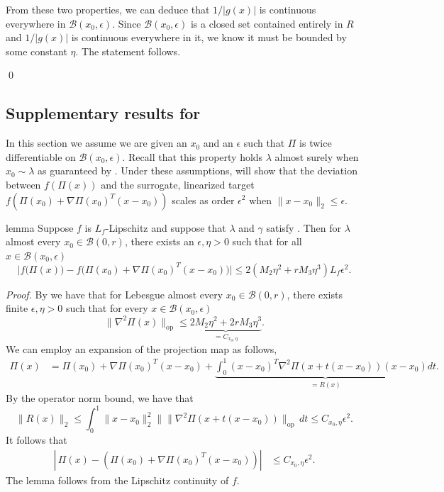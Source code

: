 \documentclass[11pt]{article}
\begin{document}
From these two properties, we can deduce that $1/|g(x)|$ is continuous everywhere in $\mathcal{B}(x_0,\epsilon)$. Since $\mathcal{B}(x_0,\epsilon)$ is a closed set contained entirely in $R$ and $1/|g(x)|$ is continuous everywhere in it, we know it must be bounded by some constant $\eta$. The statement follows.

\qed{}


\subsection{Supplementary results for }

In this section we assume we are given an $x_0$ and an $\epsilon$ such that $\Pi$ is twice differentiable on $\mathcal{B}(x_0, \epsilon)$. Recall that this property holds $\lambda$ almost surely when $x_0 \sim \lambda$ as guaranteed by . Under these assumptions,  will show that the deviation between $f(\Pi(x))$ and the surrogate, linearized target $f(\Pi(x_0) +\nabla\Pi(x_0)^T(x-x_0))$ scales as order $\epsilon^2$ when $\|x - x_0\|_2 \leq \epsilon$. 

\begin{restatable}[Approximation]{lemma}{} \label{lemma: proj approx}
    Suppose $f$ is $L_f$-Lipschitz and suppose that $\lambda$ and $\gamma$ satisfy . Then for $\lambda$ almost every $x_0 \in \mathcal{B}(0,r)$, there exists an $\epsilon, \eta > 0$ such that for all $x \in \mathcal{B}(x_0, \epsilon)$
    \[\bigg|f\big(\Pi(x)\big) - f\big(\Pi(x_0) + \nabla\Pi(x_0)^{T}(x-x_0) \big)\bigg| \le 2(M_2\eta^2+rM_3\eta^3)L_f\epsilon^2. \]
\end{restatable}

\noindent \textit{Proof.} By  we have that for Lebesgue almost every $x_0 \in \mathcal{B}(0,r)$, there exists finite $\epsilon, \eta > 0$ such that for every $x \in \mathcal{B}(x_0, \epsilon)$
\[\|\nabla^2\Pi(x)\|_{\text{op}} \leq \underbrace{2M_2\eta^{2}+2rM_3\eta^3}_{= C_{x_0, \eta}}.\]
We can employ an expansion of the projection map as follows,
\begin{align*}
    \Pi(x) &= \Pi(x_0) + \nabla\Pi(x_0)^{T}(x-x_0) + \underbrace{\int_{0}^{1}(x-x_0)^T\nabla^2\Pi(x+t(x-x_0))(x-x_0) dt}_{= R(x)}.
\end{align*}
By the operator norm bound, we have that
\[\|R(x)\|_2 \leq \int_{0}^{1}\|x - x_0\|_2^2\|\|\nabla^2\Pi(x+t(x-x_0))\|_{\text{op}} \,dt \leq C_{x_0, \eta}\epsilon^2.\]
It follows that 
\begin{align}
    \left|\,\Pi(x) - \left(\Pi(x_0) + \nabla\Pi(x_0)^{T}(x-x_0)\right)\right| &\leq C_{x_0, \eta}\epsilon^2.
\end{align}
The lemma follows from the Lipschitz continuity of $f$. 
\end{document}

